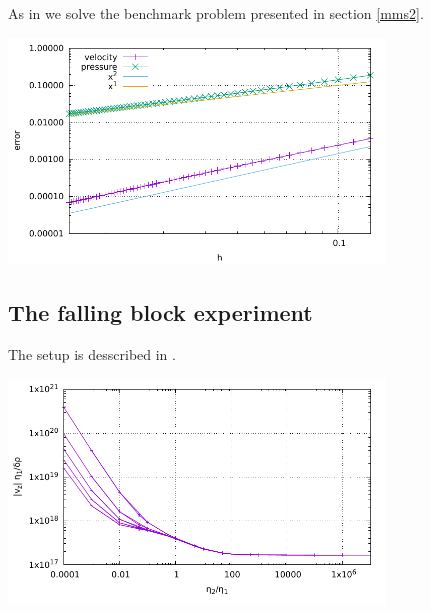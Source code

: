 As in \cite{dobo04} we solve the benchmark problem presented in section \ref{mms2}.

\includegraphics[width=10cm]{python_codes/fieldstone_22/results/case2/errors.pdf}



\subsection*{The falling block experiment} 

The setup is desscribed in \cite{thba19}.

\includegraphics[width=10cm]{python_codes/fieldstone_22/results/case3/fallingblock.pdf}







